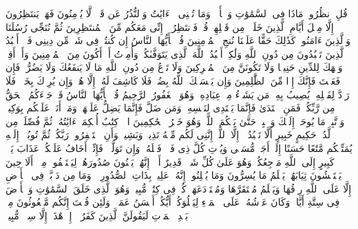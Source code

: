 \stopbuffer%
\startbuffer[\q:10:101]
قُلِ ٱنظُرُوا۟ مَاذَا فِی ٱلسَّمَٰوَٰتِ وَٱلۡأَرۡضِۚ وَمَا تُغۡنِی ٱلۡءَایَٰتُ وَٱلنُّذُرُ عَن قَوۡمࣲ لَّا یُؤۡمِنُونَ%
\stopbuffer%
\startbuffer[\q:10:102]
فَهَلۡ یَنتَظِرُونَ إِلَّا مِثۡلَ أَیَّامِ ٱلَّذِینَ خَلَوۡا۟ مِن قَبۡلِهِمۡۚ قُلۡ فَٱنتَظِرُوۤا۟ إِنِّی مَعَكُم مِّنَ ٱلۡمُنتَظِرِینَ%
\stopbuffer%
\startbuffer[\q:10:103]
ثُمَّ نُنَجِّی رُسُلَنَا وَٱلَّذِینَ ءَامَنُوا۟ۚ كَذَٰلِكَ حَقًّا عَلَیۡنَا نُنجِ ٱلۡمُؤۡمِنِینَ%
\stopbuffer%
\startbuffer[\q:10:104]
قُلۡ یَٰۤأَیُّهَا ٱلنَّاسُ إِن كُنتُمۡ فِی شَكࣲّ مِّن دِینِی فَلَاۤ أَعۡبُدُ ٱلَّذِینَ تَعۡبُدُونَ مِن دُونِ ٱللَّهِ وَلَٰكِنۡ أَعۡبُدُ ٱللَّهَ ٱلَّذِی یَتَوَفَّىٰكُمۡۖ وَأُمِرۡتُ أَنۡ أَكُونَ مِنَ ٱلۡمُؤۡمِنِینَ%
\stopbuffer%
\startbuffer[\q:10:105]
وَأَنۡ أَقِمۡ وَجۡهَكَ لِلدِّینِ حَنِیفࣰا وَلَا تَكُونَنَّ مِنَ ٱلۡمُشۡرِكِینَ%
\stopbuffer%
\startbuffer[\q:10:106]
وَلَا تَدۡعُ مِن دُونِ ٱللَّهِ مَا لَا یَنفَعُكَ وَلَا یَضُرُّكَۖ فَإِن فَعَلۡتَ فَإِنَّكَ إِذࣰا مِّنَ ٱلظَّٰلِمِینَ%
\stopbuffer%
\startbuffer[\q:10:107]
وَإِن یَمۡسَسۡكَ ٱللَّهُ بِضُرࣲّ فَلَا كَاشِفَ لَهُۥۤ إِلَّا هُوَۖ وَإِن یُرِدۡكَ بِخَیۡرࣲ فَلَا رَاۤدَّ لِفَضۡلِهِۦۚ یُصِیبُ بِهِۦ مَن یَشَاۤءُ مِنۡ عِبَادِهِۦۚ وَهُوَ ٱلۡغَفُورُ ٱلرَّحِیمُ%
\stopbuffer%
\startbuffer[\q:10:108]
قُلۡ یَٰۤأَیُّهَا ٱلنَّاسُ قَدۡ جَاۤءَكُمُ ٱلۡحَقُّ مِن رَّبِّكُمۡۖ فَمَنِ ٱهۡتَدَىٰ فَإِنَّمَا یَهۡتَدِی لِنَفۡسِهِۦۖ وَمَن ضَلَّ فَإِنَّمَا یَضِلُّ عَلَیۡهَاۖ وَمَاۤ أَنَا۠ عَلَیۡكُم بِوَكِیلࣲ%
\stopbuffer%
\startbuffer[\q:10:109]
وَٱتَّبِعۡ مَا یُوحَىٰۤ إِلَیۡكَ وَٱصۡبِرۡ حَتَّىٰ یَحۡكُمَ ٱللَّهُۚ وَهُوَ خَیۡرُ ٱلۡحَٰكِمِینَ%
\stopbuffer%
\startbuffer[\q:11:1]
الۤرۚ كِتَٰبٌ أُحۡكِمَتۡ ءَایَٰتُهُۥ ثُمَّ فُصِّلَتۡ مِن لَّدُنۡ حَكِیمٍ خَبِیرٍ%
\stopbuffer%
\startbuffer[\q:11:2]
أَلَّا تَعۡبُدُوۤا۟ إِلَّا ٱللَّهَۚ إِنَّنِی لَكُم مِّنۡهُ نَذِیرࣱ وَبَشِیرࣱ%
\stopbuffer%
\startbuffer[\q:11:3]
وَأَنِ ٱسۡتَغۡفِرُوا۟ رَبَّكُمۡ ثُمَّ تُوبُوۤا۟ إِلَیۡهِ یُمَتِّعۡكُم مَّتَٰعًا حَسَنًا إِلَىٰۤ أَجَلࣲ مُّسَمࣰّى وَیُؤۡتِ كُلَّ ذِی فَضۡلࣲ فَضۡلَهُۥۖ وَإِن تَوَلَّوۡا۟ فَإِنِّیۤ أَخَافُ عَلَیۡكُمۡ عَذَابَ یَوۡمࣲ كَبِیرٍ%
\stopbuffer%
\startbuffer[\q:11:4]
إِلَى ٱللَّهِ مَرۡجِعُكُمۡۖ وَهُوَ عَلَىٰ كُلِّ شَیۡءࣲ قَدِیرٌ%
\stopbuffer%
\startbuffer[\q:11:5]
أَلَاۤ إِنَّهُمۡ یَثۡنُونَ صُدُورَهُمۡ لِیَسۡتَخۡفُوا۟ مِنۡهُۚ أَلَا حِینَ یَسۡتَغۡشُونَ ثِیَابَهُمۡ یَعۡلَمُ مَا یُسِرُّونَ وَمَا یُعۡلِنُونَۚ إِنَّهُۥ عَلِیمُۢ بِذَاتِ ٱلصُّدُورِ%
\stopbuffer%
\startbuffer[\q:11:6]
۞ وَمَا مِن دَاۤبَّةࣲ فِی ٱلۡأَرۡضِ إِلَّا عَلَى ٱللَّهِ رِزۡقُهَا وَیَعۡلَمُ مُسۡتَقَرَّهَا وَمُسۡتَوۡدَعَهَاۚ كُلࣱّ فِی كِتَٰبࣲ مُّبِینࣲ%
\stopbuffer%
\startbuffer[\q:11:7]
وَهُوَ ٱلَّذِی خَلَقَ ٱلسَّمَٰوَٰتِ وَٱلۡأَرۡضَ فِی سِتَّةِ أَیَّامࣲ وَكَانَ عَرۡشُهُۥ عَلَى ٱلۡمَاۤءِ لِیَبۡلُوَكُمۡ أَیُّكُمۡ أَحۡسَنُ عَمَلࣰاۗ وَلَئِن قُلۡتَ إِنَّكُم مَّبۡعُوثُونَ مِنۢ بَعۡدِ ٱلۡمَوۡتِ لَیَقُولَنَّ ٱلَّذِینَ كَفَرُوۤا۟ إِنۡ هَٰذَاۤ إِلَّا سِحۡرࣱ مُّبِینࣱ%
